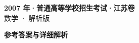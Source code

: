 \documentclass[zihao=-4, a4paper]{ctexart}
\begin{document}
\begin{center}
  {\Large\bfseries 2007 年·普通高等学校招生考试·江苏卷}\\[4pt]
  {\large 数学 · 解析版}
\end{center}
\medskip
{}

\clearpage
{}
\begin{center}{\Large\bfseries 参考答案与详细解析}\end{center}
\medskip

\end{document}
